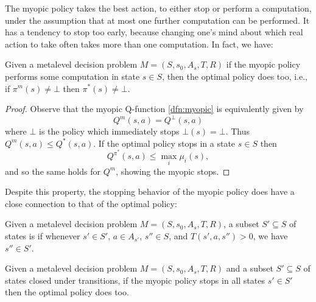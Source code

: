 The myopic policy takes the best action, to either stop or perform a computation,
under the assumption that at most one further computation can be performed.
It has a tendency to stop too early, because changing one's mind about which real action to take often takes more than one computation.
In fact, we have:

	
\begin{thm}\label{thm:optimal-myopic}
	Given a metalevel decision problem $M=(S,s_0,A_s,T,R)$
	if the myopic policy performs some computation in state $s\in S$,
	then the optimal policy does too, i.e., if $\pi^m(s)\neq\bot$ then $\pi^*(s)\neq\bot$.
\end{thm}

\begin{hiddenproof}
	\begin{proof}
		Observe that the myopic Q-function \eqref{dfn:myopic} is equivalently given by
		\[
			Q^m(s,a) = Q^\bot(s,a)
		\]
		where $\bot$ is the policy which immediately stops $\bot(s)=\bot$.
		Thus $Q^m(s,a) \le Q^*(s,a)$.  If the optimal policy stops in a state $s\in S$ then
		\[
			Q^{\pi^*}(s,a) \le \max_i \mu_i(s),
		\]
		and so the same holds for $Q^m$, showing the myopic stops.
	\end{proof}
\end{hiddenproof}


Despite this property, the stopping behavior of the myopic policy does
have a close connection to that of the optimal policy:

\begin{dfn}\label{dfn:closed}
	Given a metalevel decision problem $M=(S,s_0,A_s,T,R)$,
	a subset $S'\subseteq S$ of states is 
	if whenever $s'\in S'$, $a\in A_{s'}$, $s''\in S$, and $T(s',a,s'')>0$,
	we have $s''\in S'$.
\end{dfn}

\begin{thm}\label{thm:myopic-optimal}
	Given a metalevel decision problem $M=(S,s_0,A_s,T,R)$
	and a subset $S'\subseteq S$ of states closed under transitions,	
	if the myopic policy stops in all states $s'\in S'$
	then the optimal policy does too.	
\end{thm}

